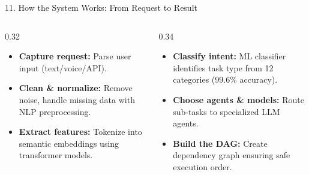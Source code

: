 \documentclass[aspectratio=169,10pt]{beamer}
\begin{document}
\begin{frame}[t]{11. How the System Works: From Request to Result}
\vspace{-0.55em}
\begin{columns}[T]
\begin{column}{0.32\textwidth}
  \begin{tcolorbox}[
    enhanced, arc=3pt, colframe=lavenderDark, colback=white,
    title={\scriptsize\bfseries Stage 1: Ingestion \& Features},
    boxrule=0.55pt, left=3.5pt, right=3.5pt, top=1.0pt, bottom=1.0pt
  ]
  \fontsize{5.8}{6.8}\selectfont
  \begin{itemize}\setlength{\itemsep}{0.8pt}
    \item \textbf{Capture request:} Parse user input (text/voice/API).
    \item \textbf{Clean \& normalize:} Remove noise, handle missing data with NLP preprocessing.
    \item \textbf{Extract features:} Tokenize into semantic embeddings using transformer models.
  \end{itemize}
  \end{tcolorbox}
\end{column}

\begin{column}{0.34\textwidth}
  \begin{tcolorbox}[
    enhanced, arc=3pt, colframe=prismTeal, colback=white,
    title={\scriptsize\bfseries Stage 2: Intelligence \& DAG},
    boxrule=0.55pt, left=3.5pt, right=3.5pt, top=1.0pt, bottom=1.0pt
  ]
  \fontsize{5.8}{6.8}\selectfont
  \begin{itemize}\setlength{\itemsep}{0.8pt}
    \item \textbf{Classify intent:} ML classifier identifies task type from 12 categories (99.6\% accuracy).
    \item \textbf{Choose agents \& models:} Route sub-tasks to specialized LLM agents.
    \item \textbf{Build the DAG:} Create dependency graph ensuring safe execution order.
  \end{itemize}
  \end{tcolorbox}
\end{column}


\end{columns}
\end{frame}
\end{document}
